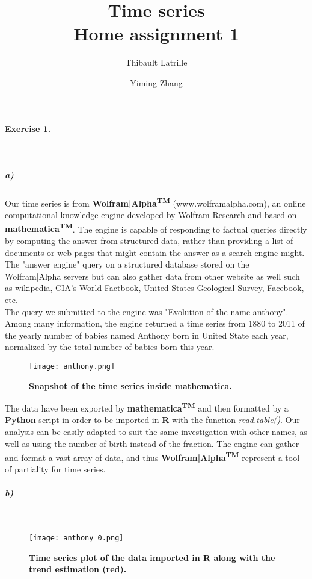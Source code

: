 \documentclass{article}
\author{Thibault Latrille \and Yiming Zhang}
\title{Time series
 \\ Home assignment 1}
\begin{document}
\maketitle

\paragraph{Exercise 1.}
\
\subparagraph{a)}
Our time series is from \textbf{Wolfram|Alpha\textsuperscript{TM}} (www.wolframalpha.com), an online computational knowledge engine developed by Wolfram Research and based on \textbf{mathematica\textsuperscript{TM}}. The engine is capable of responding to factual queries directly by computing the answer from structured data, rather than providing a list of documents or web pages that might contain the answer as a search engine might.\\

 The "answer engine" query on a structured database stored on the Wolfram|Alpha servers but can also gather data from other website as well such as wikipedia, CIA's World Factbook, United States Geological Survey, Facebook, etc. 
\\

The query we submitted to the engine was "Evolution of the name anthony". Among many information, the engine returned a time series from 1880 to 2011 of the yearly number of babies named Anthony born in United State each year, normalized by the total number of babies born this year. 
\begin{figure}[H]
	\centering
  	\texttt{[image: anthony.png]}
  	\caption{\textbf{Snapshot of the time series inside mathematica.} }
\end{figure}

The data have been exported by \textbf{mathematica\textsuperscript{TM}} and then formatted by a \textbf{Python} script in order to be imported in \textbf{R} with the function \textit{read.table()}. Our analysis can be easily adapted to suit the same investigation with other names, as well as using the number of birth instead of the fraction. The engine can gather and format a vast array of data, and thus \textbf{Wolfram|Alpha\textsuperscript{TM}} represent a tool of partiality for time series.
\subparagraph{b)}
\


\begin{figure}[H]
	\centering
  	\texttt{[image: anthony\_0.png]}
  	\caption{\textbf{Time series plot of the data imported in R along with the trend estimation (red).} }
\end{figure}
\end{document}
